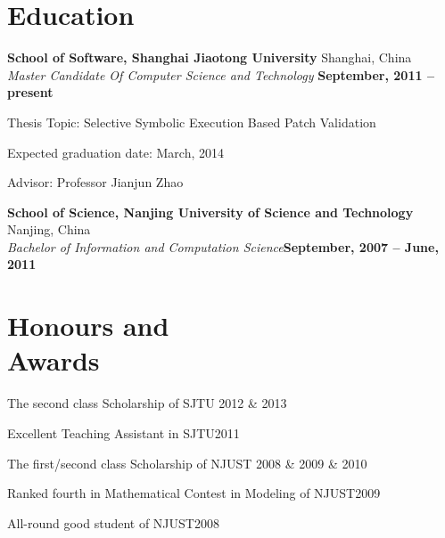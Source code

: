 \documentclass[margin, line, 11pt]{resume}
\begin{document}
\begin{resume}
    \section{\mysidestyle Education}

    \textbf{School of Software, Shanghai Jiaotong University}  Shanghai, China \vspace{2mm}\\\vspace{1mm}%
    \textsl{Master Candidate Of Computer Science and Technology} \hfill \textbf{ September, 2011 -- present}\vspace{-3mm}\\\vspace{-1mm}%
    \begin{list2}
        \item Thesis Topic: Selective Symbolic Execution Based Patch Validation
        \item Expected graduation date: March, 2014
        \item Advisor:  Professor Jianjun Zhao
    \end{list2}\vspace{-1.5mm}
    \textbf{School of Science, Nanjing University of Science and Technology}  Nanjing, China \\\vspace{1mm}%
    \textsl{Bachelor of Information and Computation Science}\hfill \textbf{September, 2007 -- June, 2011}\vspace{-3mm}\\\vspace{-1mm}%
    \vspace{-1.5mm}


    \section{\mysidestyle Honours and\\Awards}
    \begin{list2}
    \item The second class Scholarship of SJTU \hfill 2012 \& 2013
    \item Excellent Teaching Assistant in SJTU\hfill 2011
    \item The first/second class Scholarship of NJUST \hfill 2008 \& 2009 \& 2010
    \item Ranked fourth in Mathematical Contest in Modeling of NJUST\hfill 2009
    \item All-round good student of NJUST\hfill 2008
    \end{list2}


\end{resume}
\end{document}
